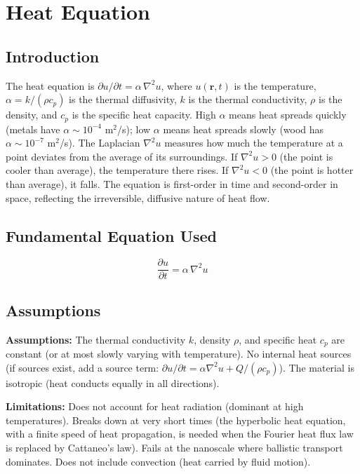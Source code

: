 \documentclass[11pt,openright]{book}
\begin{document}

\chapter{Heat Equation}

\section*{Introduction}

The heat equation is $\partial u/\partial t = \alpha\,\nabla^2 u$, where $u(\mathbf{r}, t)$ is the temperature, $\alpha = k/(\rho c_p)$ is the thermal diffusivity, $k$ is the thermal conductivity, $\rho$ is the density, and $c_p$ is the specific heat capacity. High $\alpha$ means heat spreads quickly (metals have $\alpha \sim 10^{-4}$ m$^2$/s); low $\alpha$ means heat spreads slowly (wood has $\alpha \sim 10^{-7}$ m$^2$/s). The Laplacian $\nabla^2 u$ measures how much the temperature at a point deviates from the average of its surroundings. If $\nabla^2 u > 0$ (the point is cooler than average), the temperature there rises. If $\nabla^2 u < 0$ (the point is hotter than average), it falls. The equation is first-order in time and second-order in space, reflecting the irreversible, diffusive nature of heat flow.
\section*{Fundamental Equation Used}

\[
\frac{\partial u}{\partial t}=\alpha\,\nabla^2 u
\]
\section*{Assumptions}

\textbf{Assumptions:} The thermal conductivity $k$, density $\rho$, and specific heat $c_p$ are constant (or at most slowly varying with temperature). No internal heat sources (if sources exist, add a source term: $\partial u/\partial t = \alpha\nabla^2 u + Q/(\rho c_p)$). The material is isotropic (heat conducts equally in all directions).


\textbf{Limitations:} Does not account for heat radiation (dominant at high temperatures). Breaks down at very short times (the hyperbolic heat equation, with a finite speed of heat propagation, is needed when the Fourier heat flux law is replaced by Cattaneo's law). Fails at the nanoscale where ballistic transport dominates. Does not include convection (heat carried by fluid motion).
\end{document}
